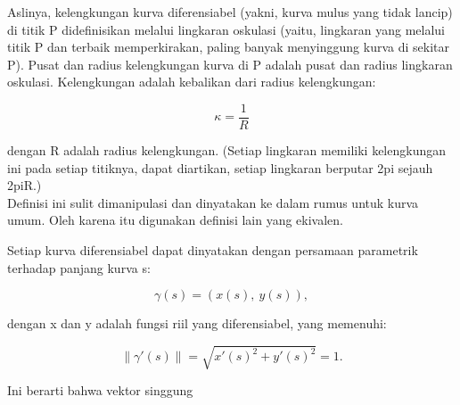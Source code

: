 \documentclass[a4paper,10pt]{article}
\begin{document}
\begin{eulernotebook}
\begin{eulercomment}
\begin{eulercomment}
\begin{eulercomment}
\begin{eulercomment}
\begin{eulercomment}
\begin{eulercomment}
\begin{eulercomment}
\begin{eulercomment}
\begin{eulercomment}
\begin{eulercomment}
\begin{eulercomment}
\begin{eulercomment}
\begin{eulercomment}
\begin{eulercomment}
\begin{eulercomment}
\begin{eulercomment}
\begin{eulercomment}
\begin{eulercomment}
\begin{eulercomment}
\begin{eulercomment}
\begin{eulercomment}
Aslinya, kelengkungan kurva diferensiabel (yakni, kurva mulus yang tidak lancip) di titik P didefinisikan melalui lingkaran
oskulasi (yaitu, lingkaran yang melalui titik P dan terbaik memperkirakan, paling banyak menyinggung kurva di sekitar P). Pusat
dan radius kelengkungan kurva di P adalah pusat dan radius lingkaran oskulasi. Kelengkungan adalah kebalikan dari radius
kelengkungan:

\end{eulercomment}
\begin{eulerformula}
\[
\kappa =\frac {1}{R}
\]
\end{eulerformula}
\begin{eulercomment}
dengan R adalah radius kelengkungan. (Setiap lingkaran memiliki kelengkungan ini pada setiap titiknya, dapat diartikan, setiap
lingkaran berputar 2pi sejauh 2piR.)\\
Definisi ini sulit dimanipulasi dan dinyatakan ke dalam rumus untuk kurva umum. Oleh karena itu digunakan definisi lain yang
ekivalen.

\end{eulercomment}
\begin{eulercomment}
Setiap kurva diferensiabel dapat dinyatakan dengan persamaan parametrik terhadap panjang kurva s:

\end{eulercomment}
\begin{eulerformula}
\[
\gamma(s) = (x(s),\ y(s)),
\]
\end{eulerformula}
\begin{eulercomment}
dengan x dan y adalah fungsi riil yang diferensiabel, yang memenuhi:

\end{eulercomment}
\begin{eulerformula}
\[
\|\gamma'(s)\|=\sqrt{x'(s)^2+y'(s)^2}=1.
\]
\end{eulerformula}
\begin{eulercomment}
Ini berarti bahwa vektor singgung



\end{eulercomment}
\end{eulercomment}
\end{eulercomment}
\end{eulercomment}
\end{eulercomment}
\end{eulercomment}
\end{eulercomment}
\end{eulercomment}
\end{eulercomment}
\end{eulercomment}
\end{eulercomment}
\end{eulercomment}
\end{eulercomment}
\end{eulercomment}
\end{eulercomment}
\end{eulercomment}
\end{eulercomment}
\end{eulercomment}
\end{eulercomment}
\end{eulercomment}
\end{eulercomment}
\end{eulernotebook}
\end{document}
